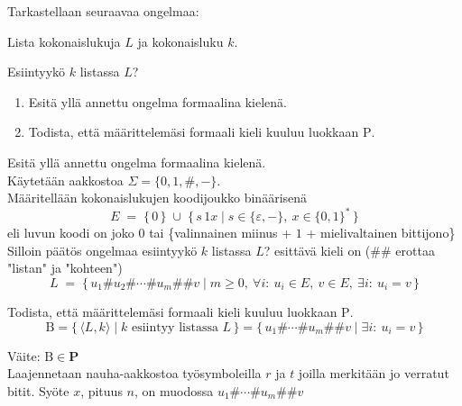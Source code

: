 \documentclass[12pt,a4paper]{article}
\newcommand{\Pee}{\mathrm{P}}
\begin{document}
  Tarkastellaan seuraavaa ongelmaa:

  \hspace{0.5cm}{\bf Annettu:} Lista kokonaislukuja $L$ ja kokonaisluku $k$.

  \hspace{0.5cm}{\bf Kysymys:} Esiintyykö $k$ listassa $L$?

  \begin{enumerate}
  \item Esitä yllä annettu ongelma formaalina kielenä.
  \item Todista, että määrittelemäsi formaali kieli kuuluu luokkaan $\Pee$.
  \end{enumerate}

  \bigskip

\begin{alakohta}
\item Esitä yllä annettu ongelma formaalina kielenä.\\

Käytetään aakkostoa $\Sigma=\{0,1,\#,-\}$. \\
Määritellään kokonaislukujen koodijoukko binäärisenä
\[
E \;=\; \{\,0\,\} \;\cup\; \{\, s\,1x \mid s\in\{\varepsilon,-\},\ x\in\{0,1\}^{*} \,\}
\]
eli luvun koodi on joko $0$ tai \{valinnainen miinus + $1$ + mielivaltainen bittijono\}\\
Silloin päätös ongelmaa esiintyykö $k$ listassa $L$? esittävä kieli on (\#\# erottaa 
"listan" ja "kohteen")
\[
L \;=\; \{\, u_1\#u_2\#\cdots\#u_m\#\#v \mid m\ge 0,\ \forall i:\ u_i\in E,\ v\in E,\ \exists i:\ u_i=v \,\}
\]


\pagebreak

\item Todista, että määrittelemäsi formaali kieli kuuluu luokkaan $\Pee$.\\

\[
\mathrm{B}
=\bigl\{\,\langle L,k\rangle \mid \text{$k$ esiintyy listassa $L$}\,\bigr\}
=\bigl\{\,u_1\#\cdots\#u_m\#\#v \mid \exists i:\ u_i=v\,\bigr\}
\]

Väite: $\mathrm{B}\in \mathbf{P}$\\


Laajennetaan nauha-aakkostoa työsymboleilla $r$ ja $t$
joilla merkitään jo verratut bitit. Syöte $x$, pituus $n$, on muodossa
$u_1\#\cdots\#u_m\#\#v$


\end{alakohta}
\end{document}
